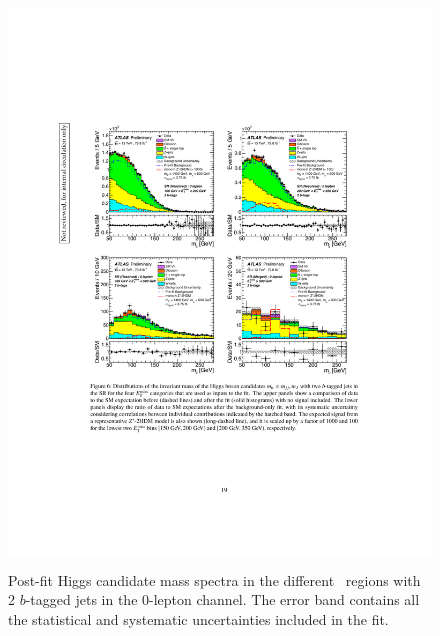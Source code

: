 \begin{figure}[!htb]
    \includegraphics[width=15cm,height=15cm, trim={4cm 9cm 4cm 6cm}, clip]{chapters/c9/figures/post-fit-0lep.pdf}

  \caption{Post-fit Higgs candidate mass spectra in the different \met~regions with \\2 $b$-tagged jets in the 0-lepton channel. The error band contains all the statistical and systematic uncertainties included in the fit.}
  \label{fig:Data_MC_SR_m_jj_2b_postfit}
  \end{figure}
  
